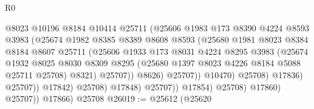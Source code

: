 \begin{lexlean}{R0}
\begin{coremodule}
                                      @8023
                                      @10196
                                      @8184
                                      @10414
                                      @25711
                                      (@25606
                                        @1983
                                        @173
                                        @8390
                                        @4224
                                        @8593
                                        @3983
                                        (@25674
                                          @1982
                                          @8385
                                          @8389
                                          @8608
                                          @8593
                                          (@25680
                                            @1981
                                            @8023
                                            @8384
                                            @8184
                                            @8607
                                            @25711
                                            (@25606
                                              @1933
                                              @173
                                              @8031
                                              @4224
                                              @8295
                                              @3983
                                              (@25674
                                                @1932
                                                @8025
                                                @8030
                                                @8309
                                                @8295
                                                (@25680 @1397 @8023 @4226 @8184 @5088 @25711 @25708)
                                                @8321)
                                              @25707))
                                          @8626)
                                        @25707))
                                    @10470)
                                  @25708)
                                @17836)
                              @25707))
                          @17842)
                        @25708)
                      @17848)
                    @25707))
                @17854)
              @25708)
            @17860)
          @25707))
      @17866)
    @25708
@26019 := @25612
    (@25620

\end{coremodule}
\end{lexlean}
